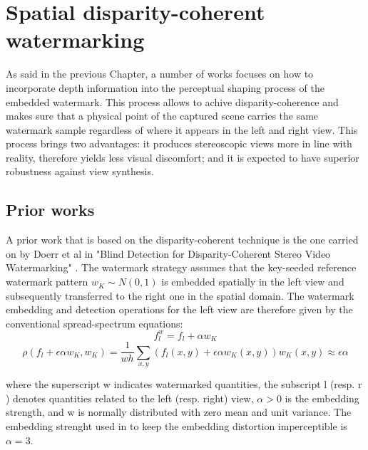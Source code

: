 \chapter{Spatial disparity-coherent watermarking}
\label{spa}



As said in the previous Chapter, a number of works focuses on how to incorporate depth information into the perceptual shaping process of the embedded watermark.\newline 
This process allows to achive disparity-coherence and makes sure that a physical point of the captured scene carries the same watermark sample regardless of where it appears in the left and right view.\newline
This process brings two advantages: it produces stereoscopic views more in line with reality, therefore yields less visual discomfort; and it is expected to have superior robustness against view synthesis.\newline

\section{Prior works} 

A prior work that is based on the disparity-coherent technique is the one carried on by Doerr et al in "Blind Detection for Disparity-Coherent
Stereo Video Watermarking" \cite{DOER2}.\newline
The watermark strategy  assumes that the key-seeded reference watermark pattern $w_{K} \sim N(0, 1)$ is embedded spatially in the left view and subsequently transferred to the right one in the spatial domain.\newline
The watermark embedding and detection operations for the left view are therefore given by the conventional spread-spectrum equations:
\begin{equation}\label{eq:doerl1}
f_{l}^{w} = f_{l}+\alpha w_{K}
\end{equation}
\begin{equation}\label{eq:doerl2}
\rho(f_{l}+\epsilon\alpha w_{K},w_{K})= \frac{1}{wh}\sum_{x,y}(f_{l}(x,y)+\epsilon\alpha w_{K}(x,y))w_{K}(x,y)\approx\epsilon\alpha
\end{equation}

where the superscript w indicates watermarked quantities, the subscript l (resp. r ) denotes quantities related to the left (resp. right) view, $\alpha > 0$ is the embedding strength, and w is normally distributed with zero mean and unit variance.\newline
The embedding strenght used in \cite{DOER2} to keep the embedding distortion imperceptible is $\alpha = 3$.\newline 


